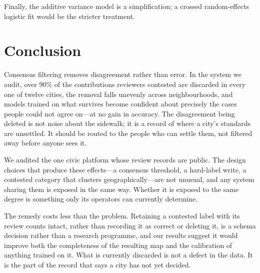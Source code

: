 \documentclass[sigconf]{acmart}
\begin{document}
Finally, the additive variance model is a simplification; a crossed
random-effects logistic fit would be the stricter treatment.

\section{Conclusion}

Consensus filtering removes disagreement rather than error. In the system we
audit, over 90\% of the contributions reviewers contested are discarded in
every one of twelve cities, the removal falls unevenly across neighbourhoods,
and models trained on what survives become confident about precisely the cases
people could not agree on---at no gain in accuracy. The disagreement being
deleted is not noise about the sidewalk; it is a record of where a city's
standards are unsettled. It should be routed to the people who can settle them,
not filtered away before anyone sees it.

We audited the one civic platform whose review records are public. The design
choices that produce these effects---a consensus threshold, a hard-label write,
a contested category that clusters geographically---are not unusual, and any
system sharing them is exposed in the same way. Whether it is exposed to the
same degree is something only its operators can currently determine.

The remedy costs less than the problem. Retaining a contested label with its
review counts intact, rather than recording it as correct or deleting it, is a
schema decision rather than a research programme, and our results suggest it
would improve both the completeness of the resulting map and the calibration of
anything trained on it. What is currently discarded is not a defect in the
data. It is the part of the record that says a city has not yet decided.



\end{document}
